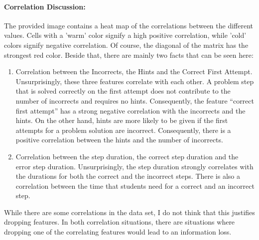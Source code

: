  \paragraph{Correlation Discussion:}
 
  The provided image contains a heat map of the correlations between the different values. Cells with a 'warm' color signify a high positive correlation, while 'cold' colors signify negative correlation. Of course, the diagonal of the matrix has the strongest red color. Beside that, there are mainly two facts that can be seen here:
  
  \begin{enumerate}
  	\item Correlation between the Incorrects, the Hints and the Correct First Attempt. Unsurprisingly, these three features correlate with each other. A problem step that is solved correctly on the first attempt does not contribute to the number of incorrects and requires no hints. Consequently, the feature “correct first attempt” has a strong negative correlation with the incorrects and the hints. On the other hand, hints are more likely to be given if the first attempts for a problem solution are incorrect. Consequently, there is a positive correlation between the hints and the number of incorrects.
  	\item Correlation between the step duration, the correct step duration and the error step duration. Unsurprisingly, the step duration strongly correlates with the durations for both the correct and the incorrect steps. There is also a correlation between the time that students need for a correct and an incorrect step.
  \end{enumerate}
  
While there are some correlations in the data set, I do not think that this justifies dropping features. In both correlation situations, there are situations where dropping one of the correlating features would lead to an information loss.


